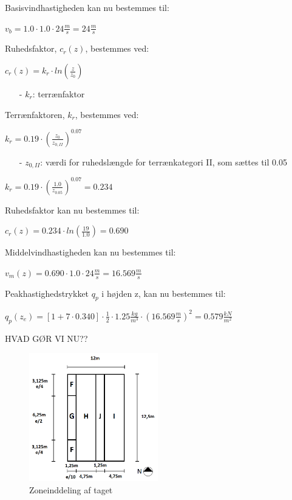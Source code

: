 Basisvindhastigheden kan nu bestemmes til:
\begin{center}
$v_b=1.0\cdot 1.0\cdot 24 \frac{m}{s}=24 \frac{m}{s}$
\end{center}
Ruhedsfaktor, $c_r(z)$, bestemmes ved:
\begin{center}
$c_r(z)=k_r\cdot ln(\frac{z}{z_0})$
\end{center}
\begin{itemize}
	\item[-] $k_r$: terrænfaktor
\end{itemize}
Terrænfaktoren, $k_r$, bestemmes ved:
\begin{center}
$k_r=0.19\cdot (\frac{z_0}{z_{0,II}})^{0.07}$
\end{center}
\begin{itemize}
	\item[-] $z_{0,II}$: værdi for ruhedslængde for terrænkategori II, som sættes til 0.05 \citep[ kapitel 4.3.2]{EU91}
\end{itemize}
\begin{center}
$k_r=0.19\cdot (\frac{1.0}{z_{0.05}})^{0.07}=0.234$
\end{center}
Ruhedsfaktor kan nu bestemmes til:
\begin{center}
$c_r(z)=0.234\cdot ln(\frac{19}{1.0})=0.690$
\end{center}
Middelvindhastigheden kan nu bestemmes til:
\begin{center}
$v_m(z)=0.690\cdot 1.0\cdot 24 \frac{m}{s}=16.569 \frac{m}{s}$
\end{center}
Peakhastighedstrykket $q_p$ i højden z, kan nu bestemmes til:
\begin{center}
$q_p(z_e)=[1+7\cdot 0.340]\cdot \frac{1}{2}\cdot 1.25 \frac{kg}{m^3}\cdot (16.569 \frac{m}{s})^2=0.579 \frac{kN}{m^2}$
\end{center}

HVAD GØR VI NU??

\begin{figure}[htbp]
	\centering
	\includegraphics[width=0.5\textwidth]{billeder/opdeling.png}
	\caption{Zoneinddeling af taget}
	\label{fig:tag}
\end{figure}


